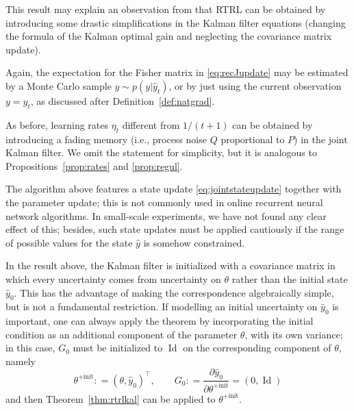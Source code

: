 \documentclass[11pt,a4paper]{article}
\newcommand{\deq}{\mathrel{\mathop{:}}=}
\newcommand{\E}{\mathbb{E}}
\DeclareMathOperator{\Id}{Id}
\newcommand{\1}{\mathbbm{1}}
\theoremstyle{yannthm}
\newtheorem{defi}{Definition}
\theoremstyle{yannthm2}
\newcommand{\transp}[1]{#1^{\!\top}\!}
\numberwithin{equation}{section}
\begin{document}
This result may explain an observation from
\cite[\S4.2]{williams1992training} that
RTRL can be obtained by introducing some drastic simplifications
in the Kalman filter equations (changing the formula of the Kalman
optimal gain and neglecting the covariance matrix update).


Again,
the expectation for the Fisher matrix in \eqref{eq:recJupdate}
may be estimated by a Monte Carlo sample $y\sim p(y|\hat y_t)$, or by
just using the current observation $y=y_t$, as discussed
after Definition~\ref{def:natgrad}.

As before, learning rates $\eta_t$ different from $1/(t+1)$ can be
obtained by introducing a fading memory (i.e., process noise $Q$
proportional to $P$) in the joint Kalman filter. We omit the statement for simplicity, but it is
analogous to Propositions~\ref{prop:rates} and \ref{prop:regul}.

The algorithm above features a state update \eqref{eq:jointstateupdate}
together with the parameter update; this is not commonly used in online
recurrent neural network algorithms. In small-scale experiments, we have
not found any clear effect of this; besides, such state updates must
be applied cautiously if the range of possible values for the state $\hat y$ is
somehow constrained.

In the result above, the Kalman filter is initialized with a
covariance matrix in which every uncertainty comes from uncertainty on
$\theta$ rather than the initial state $\hat y_0$. This has the advantage
of making the correspondence algebraically simple, but is not a
fundamental restriction. 
If modelling an initial uncertainty on $\hat y_0$ is important, one can
always apply the theorem by incorporating the initial condition as an additional component of the
parameter $\theta$, with its own variance; in this case, 
$G_0$ must be
initialized to $\Id$ on the corresponding component of $\theta$, namely
\begin{equation}
\theta^{+\mathrm{init}}\deq \transp{(\theta,\hat y_0)},\qquad
G_0\deq \frac{\partial \hat y_0}{\partial \theta^{+\mathrm{init}}}=(0,\Id)
\end{equation}
and then Theorem~\ref{thm:rtrlkal} can be applied to
$\theta^{+\mathrm{init}}$.
\end{document}
